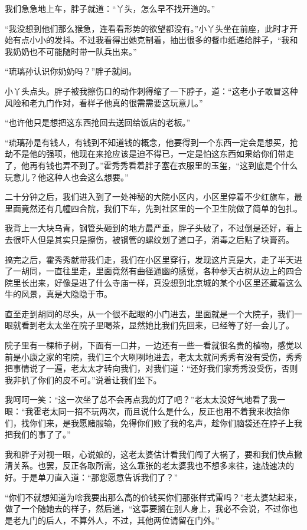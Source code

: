我们急急地上车，胖子就道：“丫头，怎么早不找开道的。”

“我没想到他们那么猴急，连看看形势的欲望都没有。”小丫头坐在前座，此时才开始有点小小的发抖。不过我看得出她克制着，抽出很多的餐巾纸递给胖子，“我和我奶奶也不可能随时带一队兵出来。”

“琉璃孙认识你奶奶吗？”胖子就间。

小丫头点头。胖子被我擦伤口的动作刺得缩了一下脖子，道：“这老小子敢冒这种风险和老九门作对，看样子他真的很需需要这玩意儿。”

“也许他只是想把这东西抢回去送回给饭店的老板。”

“琉璃孙是有钱人，有钱到不知道钱的概念，他要得到一个东西一定会是想买，抢劫不是他的强项，他现在来抢应该是迫不得已，一定是怕这东西如果给你们带走了，他再有钱也弄不到了。”霍秀秀看着胖子塞在衣服里的玉玺，“这到底是个什么玩意儿？他这种人也会这么想要。”

二十分钟之后，我们进入到了一处神秘的大院小区内，小区里停着不少红旗车，最里面竟然还有几幢四合院，我们下车，先到社区里的一个卫生院做了简单的包扎。

我背上一大块乌青，钢管头砸到的地方最严重，胖子头破了，不过倒是还好，看上去很吓人但是其实只是擦伤，被钢管的螺纹划了道口子，消毒之后贴了块膏药。

搞完之后，霍秀秀就带我们走，我们在小区里穿行，发现这片真是大，走了半天进了一胡同，一直往里走，里面竟然有曲径通幽的感觉，各种参天古树从边上的四合院里长出来，好像是进了什么寺庙一样，真没想到北京城的某个小区里还藏着这么牛的风景，真是大隐隐于市。

直至走到胡同的尽头，从一个很不起眼的小门进去，里面就是一个大院子，我们一眼就看到老太太坐在院子里喝茶，显然她比我们先回来，已经等了好一会儿了。

院子里有一棵柿子树，下面有一口井，一边还有一些一看就很名贵的植物，感觉以前是小康之家的宅院，我们三个大咧咧地进去，老太太就问秀秀有没有受伤，秀秀把事情说了一遍，老太太才转向我们，对我们道：“还好我们家秀秀没受伤，否则我非扒了你们的皮不可。”说着让我们坐下。

我呵呵一笑：“这一次坐了总不会再点我的灯了吧？”老太太没好气地看了我一眼：“我霍老太同一招不玩两次，而且说什么是什么，反正也用不着我来收拾你们，找你们来，是我愿赌服输，免得你们败了我的名声，趁你们脑袋还在脖子上我把我们的事了了。”

我和胖子对视一眼，心说娘的，这老太婆估计看我们闯了大祸了，要和我们快点撇清关系。也罢，反正各取所需，这么乖张的老太婆我也不想多来往，速战速决的好。于是单刀直入道：“那您愿意告诉我们了？”

“你们不就想知道为啥我要出那么高的价钱买你们那张样式雷吗？”老太婆站起来，做了一个随她去的样子，然后道，“这事要搁在别人身上，我必不会说，不过你也是老九门的后人，不算外人，不过，其他两位请留在门外。”

